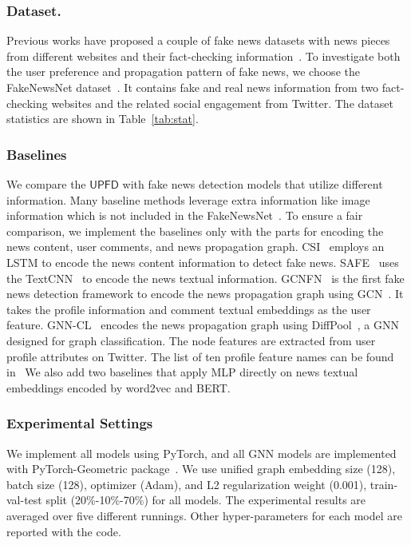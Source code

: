 \documentclass[sigconf]{acmart}
\newcommand\UPFD{$\mathsf{UPFD}$\xspace}
\begin{document}
\subsubsection{Dataset.}
Previous works have proposed a couple of fake news datasets with news pieces from different websites and their fact-checking information~\cite{wang2017liar, potthast_martin_2018_1239675}. 
To investigate both the user preference and propagation pattern of fake news, we choose the FakeNewsNet dataset~\cite{shu2018fakenewsnet}.
It contains fake and real news information from two fact-checking websites and the related social engagement from Twitter.
The dataset statistics are shown in Table~\ref{tab:stat}.



\subsubsection{Baselines}

We compare the \UPFD with fake news detection models that utilize different information.
Many baseline methods leverage extra information like image information which is not included in the FakeNewsNet~\cite{shu2018fakenewsnet}.
To ensure a fair comparison, we implement the baselines only with the parts for encoding the news content, user comments, and news propagation graph. 
CSI~\cite{ruchansky2017csi} employs an LSTM to encode the news content information to detect fake news.
SAFE~\cite{zhou2020mathsf} uses the TextCNN~\cite{zhang2015sensitivity} to encode the news textual information.
GCNFN~\cite{monti2019fake} is the first fake news detection framework to encode the news propagation graph using GCN~\cite{kipf2016semi}.
It takes the profile information and comment textual embeddings as the user feature.
GNN-CL~\cite{han2020graph} encodes the news propagation graph using DiffPool~\cite{ying2018hierarchical}, a GNN designed for graph classification.
The node features are extracted from user profile attributes on Twitter.
The list of ten profile feature names can be found in~\cite{han2020graph, lu2020gcan}
We also add two baselines that apply MLP directly on news textual embeddings encoded by word2vec and BERT.



\subsubsection{Experimental Settings}
\label{sec:exp_settings}
We implement all models using PyTorch, and all GNN models are implemented with PyTorch-Geometric package~\cite{Fey2019fast}.
We use unified graph embedding size (128), batch size (128), optimizer (Adam), and L2 regularization weight (0.001), train-val-test split (20\%-10\%-70\%) for all models.
The experimental results are averaged over five different runnings. 
Other hyper-parameters for each model are reported with the code.
\end{document}
